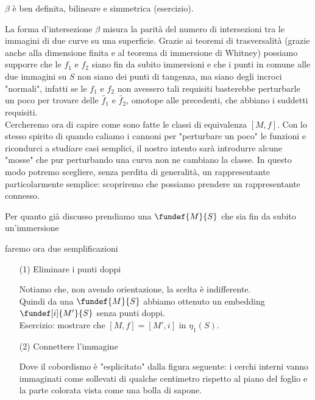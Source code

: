\begin{oss}
	$\beta$ è ben definita, bilineare e simmetrica (esercizio).
\end{oss}

La forma d'intersezione $\beta$ misura la parità del numero di intersezioni tra le immagini di due curve su una superficie. Grazie ai teoremi di trasversalità (grazie anche alla dimensione finita e al teorema di immersione di Whitney) possiamo supporre che le $f_1$ e $f_2$ siano fin da subito immersioni e che i punti in comune alle due immagini su $S$ non siano dei punti di tangenza, ma siano degli incroci "normali", infatti se le $f_1$ e $f_2$ non avessero tali requisiti basterebbe perturbarle un poco per trovare delle $\tilde{f_1}$ e $\tilde{f_2}$, omotope alle precedenti, che abbiano i suddetti requisiti. \\

Cercheremo ora di capire come sono fatte le classi di equivalenza $[M,f]$. Con lo stesso spirito di quando caliamo i cannoni per "perturbare un poco" le funzioni e ricondurci a studiare casi semplici, il nostro intento sarà introdurre alcune "mosse" che pur perturbando una curva non ne cambiano la classe. In questo modo potremo scegliere, senza perdita di generalità, un rappresentante particolarmente semplice: scopriremo che possiamo prendere un rappresentante connesso.

Per quanto già discusso prendiamo una $\fundef{M}{S}$ che sia fin da subito un'immersione
\begin{center}
  
\end{center}
faremo ora due semplificazioni

\begin{itemize}
\item[(1)] Eliminare i punti doppi
\begin{center}
  
\end{center}
Notiamo che, non avendo orientazione, la scelta è indifferente. \\
Quindi da una $\fundef{M}{S}$ abbiamo ottenuto un embedding $\fundef[i]{M'}{S}$ senza punti doppi. \\
Esercizio: mostrare che $[M,f] = [M',i]$ in $\eta_1(S)$.

\item[(2)] Connettere l'immagine
\begin{center}
  
\end{center}
Dove il cobordismo è "esplicitato" dalla figura seguente: i cerchi interni vanno immaginati come sollevati di qualche centimetro rispetto al piano del foglio e la parte colorata vista come una bolla di sapone.
\begin{center}
  
\end{center}
\end{itemize}


